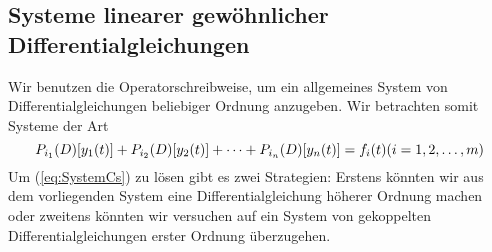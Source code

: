 \subsection{Systeme linearer gewöhnlicher Differentialgleichungen}
Wir benutzen die Operatorschreibweise, um ein allgemeines System von
Differentialgleichungen beliebiger Ordnung anzugeben. Wir betrachten somit
Systeme der Art
\begin{equation}
  P_{i_1}(D)[y_1(t)]+P_{i_2}(D)[y_2(t)]+\dots+P_{i_n}(D)[y_n(t)]=f_i(t)\hfill
  (i=1,2,\dots,m)
  \label{eq:SystemGeneral}
\end{equation}
Um (\ref{eq:SystemCs}) zu lösen gibt es zwei Strategien: Erstens könnten wir
aus dem vorliegenden System eine Differentialgleichung höherer Ordnung machen
oder zweitens könnten wir versuchen auf ein System von gekoppelten
Differentialgleichungen erster Ordnung überzugehen.

